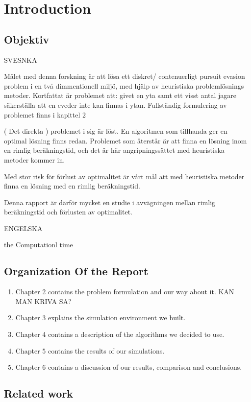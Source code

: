\chapter{Introduction}

\section{Objektiv}

SVESNKA

Målet med denna forskning är att lösa ett diskret/ contenuerligt pursuit evasion problem i en två dimmentionell miljö, med hjälp av heuristiska problemlösnings metoder.
Kortfattat är problemet att: givet en yta samt ett visst antal jagare säkerställa att en eveder inte kan finnas i ytan. Fullständig formulering av problemet finns i kapittel 2

( Det direkta ) problemet i sig är löst. En algoritmen som tillhanda ger en optimal lösning finns redan. 
Problemet som återstår är att finna en lösning inom en rimlig beräkningstid, och det är här angripningssättet med heuristiska metoder kommer in.

Med stor risk för förlust av optimalitet är vårt mål att med heuristiska metoder finna en lösning med en rimlig beräkningstid.

Denna rapport är därför mycket en studie i avvägningen mellan rimlig beräkningstid och förlusten av optimalitet.


ENGELSKA

the Computationl time 


\section{Organization Of the Report}
\begin{enumerate}
\item Chapter 2 contains the problem formulation and our way about it. KAN MAN KRIVA SA?
\item Chapter 3 explains the simulation environment we built.
\item Chapter 4 contains a description of the algorithms we decided to use.
\item Chapter 5 contains the results of our simulations.
\item Chapter 6 contains a discussion of our results, comparison and conclusions.
\end{enumerate}

\section{ Related work}

